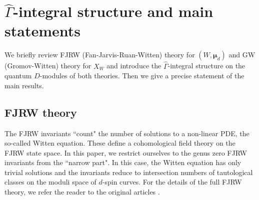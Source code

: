 \documentclass[11pt]{amsart}
\theoremstyle{definition} %
\theoremstyle{remark} %
\newcommand{\bmu}{\boldsymbol{\mu}}
\newcommand{\hGamma}{\widehat{\Gamma}}
\begin{document}
\section{$\hGamma$-integral structure 
and main statements} 
\label{sec:setup} 

We briefly review FJRW (Fan-Jarvis-Ruan-Witten) theory for $(W,\bmu_d)$ 
and GW (Gromov-Witten) theory for $X_W$ 
and introduce the $\hGamma$-integral structure
on the quantum $D$-modules of both theories. 
Then we give a precise statement of the main results. 
 

\subsection{FJRW theory} 
The FJRW invariants ``count" the number of 
solutions to a non-linear PDE, the so-called Witten equation. 
These define a cohomological field theory on the 
FJRW state space. 
In this paper, we restrict ourselves to the genus zero 
FJRW invariants from the ``narrow part".  
In this case, the Witten equation has only trivial 
solutions and the invariants  
reduce to intersection numbers of tautological 
classes on the moduli space of $d$-spin curves. 
For the details of the full FJRW theory, we refer the 
reader to the original articles \cite{FJR:virt, FJR1}. 
\end{document}
